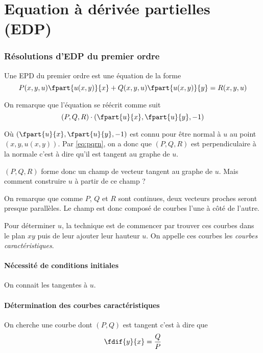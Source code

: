 


\part{Equation à dérivée partielles (EDP)}
\section{Résolutions d'EDP du premier ordre}
Une EPD du premier ordre est une équation de la forme
\[ P(x, y, u)\fpart{u(x, y)}{x} %
  + Q(x, y, u)\fpart{u(x, y)}{y}
  = R(x, y, u) \]

On remarque que l'équation se réécrit comme suit
\begin{equation}
  \left(P, Q, R\right) \cdot \left(
  \fpart{u}{x}, \fpart{u}{y}, -1\right) \label{eq:pqrn}
\end{equation}

Où $\left(\fpart{u}{x}, \fpart{u}{y}, -1\right)$ est connu pour être normal
à $u$ au point $\left(x, y, u(x, y)\right)$.
Par \eqref{eq:pqrn}, on a donc que $(P, Q, R)$ est perpendiculaire à la normale
c'est à dire qu'il est tangent au graphe de $u$.

$(P, Q, R)$ forme donc un champ de vecteur tangent au graphe de $u$.
Mais comment construire $u$ à partir de ce champ ?

On remarque que comme $P$, $Q$ et $R$ sont continues, deux vecteurs proches
seront presque parallèles. Le champ est donc composé de courbes l'une à côté
de l'autre.

Pour déterminer $u$, la technique est de commencer par trouver ces courbes
dans le plan $xy$ puis de leur ajouter leur hauteur $u$.
On appelle ces courbes les \emph{courbes caractéristiques}.

\subsection{Nécessité de conditions initiales}
On connait les tangentes à $u$.

\subsection{Détermination des courbes caractéristiques}
On cherche une courbe dont $(P, Q)$ est tangent c'est à dire que
\[ \fdif{y}{x} = \frac{Q}{P} \]


